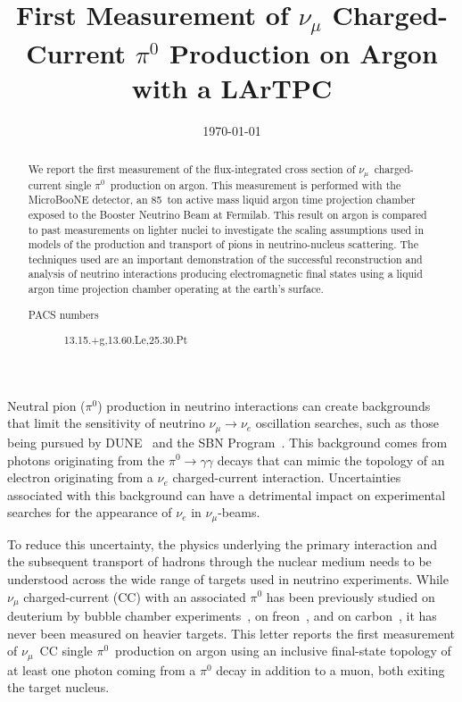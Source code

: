 \documentclass[%
 reprint,
superscriptaddress,
amsmath,amssymb,
prl,
floatfix,
]{revtex4-1}
\newcommand{\numu}{\nu_{\mu}}
\newcommand{\nue}{\nu_{e}}
\newcommand{\pio}{\pi^{0}}
\begin{document}
\title{First Measurement of $\numu$ Charged-Current $\pio$ Production on Argon with a LArTPC}



\date{\today}

\begin{abstract}
We report the first measurement of the flux-integrated cross section of $\numu$~charged-current single $\pio$~production on argon. This measurement is performed with the MicroBooNE detector, an 85~ton active mass liquid argon time projection chamber exposed to the Booster Neutrino Beam at Fermilab. This result on argon is compared to past measurements on lighter nuclei to investigate the scaling assumptions used in models of the production and transport of pions in neutrino-nucleus scattering. The techniques used are an important demonstration of the successful reconstruction and analysis of neutrino interactions producing electromagnetic final states using a liquid argon time projection chamber operating at the earth's surface.
\begin{description}
\item[PACS numbers] 13.15.+g,13.60.Le,25.30.Pt
\end{description}
\end{abstract}

\maketitle

Neutral pion ($\pio$) production in neutrino interactions can create backgrounds that limit the sensitivity of neutrino $\numu\rightarrow\nu_{e}$ oscillation searches, such as those being pursued by DUNE~\cite{duneIDR1,duneIDR2,duneIDR3} and the SBN Program~\cite{SBN}. This background comes from photons originating from the $\pio\rightarrow\gamma\gamma$ decays that can mimic the topology of an electron originating from a $\nue$ charged-current interaction. Uncertainties associated with this background can have a detrimental impact on experimental searches for the appearance of $\nue$ in $\numu$-beams.

To reduce this uncertainty, the physics underlying the primary interaction and the subsequent transport of hadrons through the nuclear medium needs to be understood across the wide range of targets used in neutrino experiments. While $\numu$ charged-current (CC) with an associated $\pio$ has been previously studied on deuterium by bubble chamber experiments~\cite{bub_anl,bub_bnl1,bub_bnl2,BEBC}, on freon~\cite{SKAT}, and on carbon~\cite{minpi0_1,minpi0_2,mbpi0,KEK}, it has never been measured on heavier targets. This letter reports the first measurement of $\numu$~CC single $\pio$~production on argon using an inclusive final-state topology of at least one photon coming from a $\pio$ decay in addition to a muon, both exiting the target nucleus. 
\end{document}
